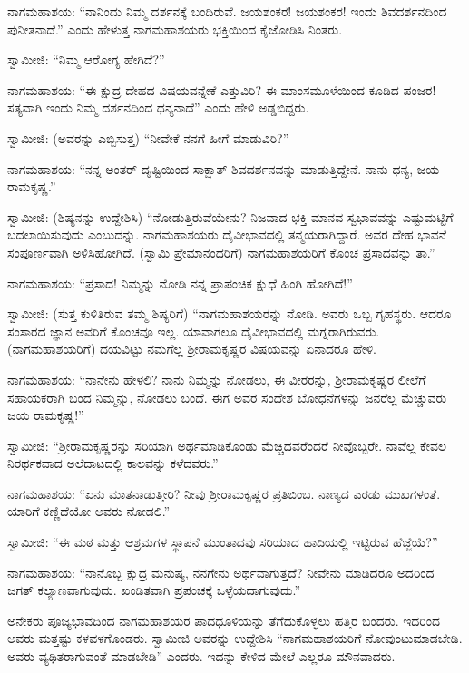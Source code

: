 \vskip 1pt

 ನಾಗಮಹಾಶಯ: “ನಾನಿಂದು ನಿಮ್ಮ ದರ್ಶನಕ್ಕೆ ಬಂದಿರುವೆ. ಜಯಶಂಕರ! ಜಯಶಂಕರ! ಇಂದು ಶಿವದರ್ಶನದಿಂದ ಪುನೀತನಾದೆ.” ಎಂದು ಹೇಳುತ್ತ ನಾಗಮಹಾಶಯರು ಭಕ್ತಿಯಿಂದ ಕೈಜೋಡಿಸಿ ನಿಂತರು. 

\vskip 1pt

 ಸ್ವಾಮೀಜಿ: “ನಿಮ್ಮ ಆರೋಗ್ಯ ಹೇಗಿದೆ?” 

\vskip 1pt

 ನಾಗಮಹಾಶಯ: “ಈ ಕ್ಷುದ್ರ ದೇಹದ ವಿಷಯವನ್ನೇಕೆ ಎತ್ತುವಿರಿ? ಈ ಮಾಂಸಮೂಳೆಯಿಂದ ಕೂಡಿದ ಪಂಜರ! ಸತ್ಯವಾಗಿ ಇಂದು ನಿಮ್ಮ ದರ್ಶನದಿಂದ ಧನ್ಯನಾದೆ” ಎಂದು ಹೇಳಿ ಅಡ್ಡಬಿದ್ದರು. 

\vskip 1pt

 ಸ್ವಾಮೀಜಿ: (ಅವರನ್ನು ಎಬ್ಬಿಸುತ್ತ) “ನೀವೇಕೆ ನನಗೆ ಹೀಗೆ ಮಾಡುವಿರಿ?” 

\vskip 1pt

 ನಾಗಮಹಾಶಯ: “ನನ್ನ ಅಂತರ್ ದೃಷ್ಟಿಯಿಂದ ಸಾಕ್ಷಾತ್ ಶಿವದರ್ಶನವನ್ನು ಮಾಡುತ್ತಿದ್ದೇನೆ. ನಾನು ಧನ್ಯ, ಜಯ ರಾಮಕೃಷ್ಣ.” 

\vskip 1pt

 ಸ್ವಾಮೀಜಿ: (ಶಿಷ್ಯನನ್ನು ಉದ್ದೇಶಿಸಿ) “ನೋಡುತ್ತಿರುವೆಯೇನು? ನಿಜವಾದ ಭಕ್ತಿ ಮಾನವ ಸ್ವಭಾವವನ್ನು ಎಷ್ಟುಮಟ್ಟಿಗೆ ಬದಲಾಯಿಸುವುದು ಎಂಬುದನ್ನು. ನಾಗಮಹಾಶಯರು ದೈವೀಭಾವದಲ್ಲಿ ತನ್ಮಯರಾಗಿದ್ದಾರೆ. ಅವರ ದೇಹ ಭಾವನೆ ಸಂಪೂರ್ಣವಾಗಿ ಅಳಿಸಿಹೋಗಿದೆ. (ಸ್ವಾಮಿ ಪ್ರೇಮಾನಂದರಿಗೆ) ನಾಗಮಹಾಶಯರಿಗೆ ಕೊಂಚ ಪ್ರಸಾದವನ್ನು ತಾ.” 

 ನಾಗಮಹಾಶಯ: “ಪ್ರಸಾದ! ನಿಮ್ಮನ್ನು ನೋಡಿ ನನ್ನ ಪ್ರಾಪಂಚಿಕ ಕ್ಷುಧೆ ಹಿಂಗಿ ಹೋಗಿದೆ!” 

 ಸ್ವಾಮೀಜಿ: (ಸುತ್ತ ಕುಳಿತಿರುವ ತಮ್ಮ ಶಿಷ್ಯರಿಗೆ) “ನಾಗಮಹಾಶಯರನ್ನು ನೋಡಿ. ಅವರು ಒಬ್ಬ ಗೃಹಸ್ಥರು. ಆದರೂ ಸಂಸಾರದ ಜ್ಞಾನ ಅವರಿಗೆ ಕೊಂಚವೂ ಇಲ್ಲ. ಯಾವಾಗಲೂ ದೈವೀಭಾವದಲ್ಲಿ ಮಗ್ನರಾಗಿರುವರು. (ನಾಗಮಹಾಶಯರಿಗೆ) ದಯವಿಟ್ಟು ನಮಗೆಲ್ಲ ಶ‍್ರೀರಾಮಕೃಷ್ಣರ ವಿಷಯವನ್ನು ಏನಾದರೂ ಹೇಳಿ. 

 ನಾಗಮಹಾಶಯ: “ನಾನೇನು ಹೇಳಲಿ? ನಾನು ನಿಮ್ಮನ್ನು ನೋಡಲು, ಈ ವೀರರನ್ನು, ಶ‍್ರೀರಾಮಕೃಷ್ಣರ ಲೀಲೆಗೆ ಸಹಾಯಕರಾಗಿ ಬಂದ ನಿಮ್ಮನ್ನು, ನೋಡಲು ಬಂದೆ. ಈಗ ಅವರ ಸಂದೇಶ ಬೋಧನೆಗಳನ್ನು ಜನರೆಲ್ಲ ಮೆಚ್ಚುವರು ಜಯ ರಾಮಕೃಷ್ಣ!” 

 ಸ್ವಾಮೀಜಿ: “ಶ‍್ರೀರಾಮಕೃಷ್ಣರನ್ನು ಸರಿಯಾಗಿ ಅರ್ಥಮಾಡಿಕೊಂಡು ಮೆಚ್ಚಿದವರೆಂದರೆ ನೀವೊಬ್ಬರೇ. ನಾವೆಲ್ಲ ಕೇವಲ ನಿರರ್ಥಕವಾದ ಅಲೆದಾಟದಲ್ಲಿ ಕಾಲವನ್ನು ಕಳೆದವರು.” 

 ನಾಗಮಹಾಶಯ: “ಏನು ಮಾತನಾಡುತ್ತೀರಿ? ನೀವು ಶ‍್ರೀರಾಮಕೃಷ್ಣರ ಪ್ರತಿಬಿಂಬ. ನಾಣ್ಯದ ಎರಡು ಮುಖಗಳಂತೆ. ಯಾರಿಗೆ ಕಣ್ಣಿದೆಯೋ ಅವರು ನೋಡಲಿ.” 

 ಸ್ವಾಮೀಜಿ: “ಈ ಮಠ ಮತ್ತು ಆಶ್ರಮಗಳ ಸ್ಥಾಪನೆ ಮುಂತಾದವು ಸರಿಯಾದ ಹಾದಿಯಲ್ಲಿ ಇಟ್ಟಿರುವ ಹೆಜ್ಜೆಯೆ?” 

 ನಾಗಮಹಾಶಯ: “ನಾನೊಬ್ಬ ಕ್ಷುದ್ರ ಮನುಷ್ಯ, ನನಗೇನು ಅರ್ಥವಾಗುತ್ತದೆ? ನೀವೇನು ಮಾಡಿದರೂ ಅದರಿಂದ ಜಗತ್ ಕಲ್ಯಾಣವಾಗುವುದು. ಖಂಡಿತವಾಗಿ ಪ್ರಪಂಚಕ್ಕೆ ಒಳ್ಳೆಯದಾಗುವುದು.” 

 ಅನೇಕರು ಪೂಜ್ಯಭಾವದಿಂದ ನಾಗಮಹಾಶಯರ ಪಾದಧೂಳಿಯನ್ನು ತೆಗೆದುಕೊಳ್ಳಲು ಹತ್ತಿರ ಬಂದರು. ಇದರಿಂದ ಅವರು ಮತ್ತಷ್ಟು ಕಳವಳಗೊಂಡರು. ಸ್ವಾಮೀಜಿ ಅವರನ್ನು ಉದ್ದೇಶಿಸಿ “ನಾಗಮಹಾಶಯರಿಗೆ ನೋವುಂಟುಮಾಡಬೇಡಿ. ಅವರು ವ್ಯಥಿತರಾಗುವಂತೆ ಮಾಡಬೇಡಿ” ಎಂದರು. ಇದನ್ನು ಕೇಳಿದ ಮೇಲೆ ಎಲ್ಲರೂ ಮೌನವಾದರು. 

